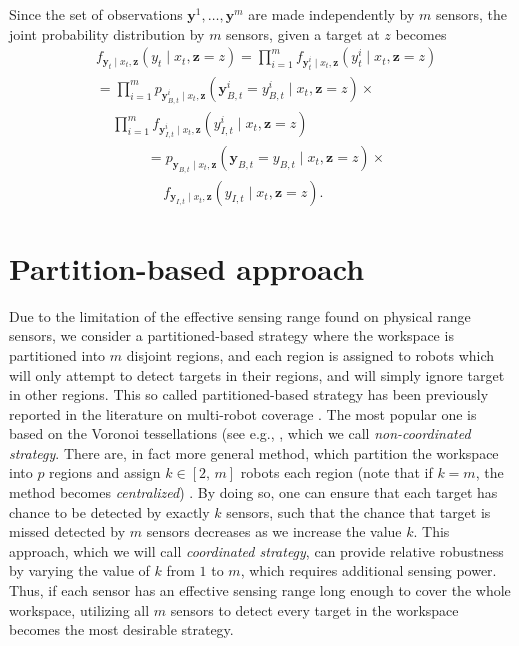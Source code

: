 \documentclass[journal]{IEEEtran}
\begin{document}
Since the set of observations $\bm{y}^1,\dots,\bm{y}^m$ are made independently by $m$ sensors, the joint probability distribution by $m$ sensors, given a target at $z$ becomes
\begin{align*}
&f_{\bm{y}_t\mid x_t,\bm{z}}
\left(
y_t
 \mid x_t,\bm{z}=z
\right) 
= \prod_{i=1}^m
f_{\bm{y}_t^i\mid x_t,\bm{z}}
\left(
y_t^i \mid x_t,\bm{z}=z \right) \\
&= \prod_{i=1}^m p_{\bm{y}_{B,t}^i\mid x_t,\bm{z}}
\left(
\bm{y}_{B,t}^i=y_{B,t}^i\mid x_t,\bm{z}=z \right) 
\times \\
&\,\,\,\,\,\,\,\prod_{i=1}^m 
f_{\bm{y}_{I,t}^i\mid x_t,\bm{z}}
\left(
y_{I,t}^i
\mid x_t,\bm{z}=z
\right) 
\end{align*}
\begin{align*}
&= p_{\bm{y}_{B,t}\mid x_t,\bm{z}}
\left(
\bm{y}_{B,t}=y_{B,t}
\mid x_t,\bm{z}=z
\right) \times \\
&\,\,\,\,\,\,\,f_{\bm{y}_{I,t}\mid x_t,\bm{z}}
\left(
y_{I,t}
\mid x_t,\bm{z}=z
\right).
\end{align*}






\section{Partition-based approach}
\label{sec:sec4}
Due to the limitation of the effective sensing range found on physical range sensors, we consider a partitioned-based strategy where the workspace is partitioned into $m$ disjoint regions, and each region is assigned to robots which will only attempt to detect targets in their regions, and will simply ignore target in other regions. This so called partitioned-based strategy has been previously reported in the literature on multi-robot coverage \cite{cortes_coverage_2004,hutchinson_robust_2012,schwager2009decentralized,park2014robust}. The most popular one is based on the Voronoi tessellations (see e.g., \cite{cortes_coverage_2004}, which we call \emph{non-coordinated strategy}.
There are, in fact more general method, which partition the workspace into $p$ regions and assign $k \in [2,\,m]$ robots each region (note that if $k=m$, the method becomes \emph{centralized}) \cite{hutchinson_robust_2012}. By doing so, one can ensure that each target has chance to be detected by exactly $k$ sensors, such that the chance that target is missed detected by $m$ sensors decreases as we increase the value $k$. This approach, which we will call \emph{coordinated strategy}, can provide relative robustness by varying the value of $k$ from $1$ to $m$, which requires additional sensing power. Thus, if each sensor has an effective sensing range long enough to cover the whole workspace, utilizing all $m$ sensors to detect every target in the workspace becomes the most desirable strategy.
\end{document}
